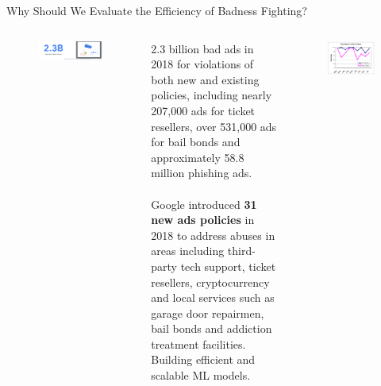 \documentclass[nobackground,dvipsnames,table,aspectratio=169]{beamer}
\begin{document}
\begin{frame}{Why Should We Evaluate the Efficiency of Badness Fighting?}
    \begin{columns}[T]
            \begin{figure}
                \includegraphics[width=\textwidth]{bad-ads-taken-down}
            \end{figure}
            \tiny
            2.3 billion bad ads in 2018 for violations of both new and existing policies, including nearly 207,000 ads for ticket resellers, over 531,000 ads for bail bonds and approximately 58.8 million phishing ads. \\~\\

            Google  introduced \textbf{31 new ads policies} in 2018 to address abuses in areas including third-party tech support, ticket resellers, cryptocurrency and local services such as garage door repairmen, bail bonds and addiction treatment facilities.
            \centering
            Building efficient and scalable ML models.\\
            \begin{figure}
                \includegraphics[width=\textwidth]{case-based-vs-naive-bayes}
            \end{figure}
    \end{columns}
\end{frame}
\end{document}
